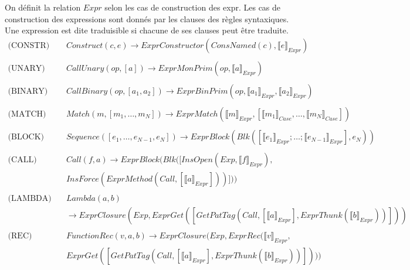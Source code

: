 \documentclass[
  12pt,
]{article}
\begin{document}
On définit la relation \({Expr}\) selon les cas de construction
des expr. Les cas de construction des expressions sont donnés par les
clauses des règles syntaxiques. Une expression est dite traduisible si
chacune de ses clauses peut être traduite. \begin{align*}
  \text{(CONSTR)} \quad & Construct(c,e) \rightarrow  ExprConstructor(ConsNamed(c), \llbracket e \rrbracket_{Expr})                                                                  \\
  \\
  \text{(UNARY)} \quad  & CallUnary(op, [a]) \rightarrow  ExprMonPrim(op, \llbracket a \rrbracket_{Expr})                                                                            \\
  \\
  \text{(BINARY)} \quad & CallBinary(op, [a_1,a_2]) \rightarrow  ExprBinPrim(op, \llbracket a_1 \rrbracket_{Expr}, \llbracket a_2 \rrbracket_{Expr})                                 \\                                    \\
  \text{(MATCH)} \quad  & Match(m,[m_1,\dots,m_N]) \rightarrow  ExprMatch(\llbracket m \rrbracket_{Expr}, [\llbracket m_1 \rrbracket_{Case},\dots,\llbracket m_N \rrbracket_{Case}]) \\
  \\
  \text{(BLOCK)} \quad  & Sequence([e_1,\dots,e_{N-1}, e_N])
  \rightarrow  ExprBlock(Blk([\llbracket e_1 \rrbracket_{Expr}; \dots ; \llbracket e_{N-1} \rrbracket_{Expr}], e_N))                                                                 \\
  \\
  \text{(CALL)} \quad   & Call(f, a)                                                 \rightarrow  ExprBlock(Blk([InsOpen(Exp, \llbracket f \rrbracket_{Expr} ),                      \\ & InsForce(ExprMethod(Call, [\llbracket a \rrbracket_{Expr}]))]))                                       \\
  \\
  \text{(LAMBDA)} \quad & Lambda(a, b)                                                                                                                                               \\
                        & \rightarrow  ExprClosure(Exp, ExprGet([GetPatTag(Call, [\llbracket a \rrbracket_{Expr}], ExprThunk(\llbracket b \rrbracket_{Expr}))]))                     \\
  \\
  \text{(REC)} \quad    & FunctionRec(v, a, b)
  \rightarrow  ExprClosure(Exp,ExprRec(\llbracket v \rrbracket_{Expr},                                                                                                               \\  & ExprGet([GetPatTag(Call, [\llbracket a \rrbracket_{Expr}], ExprThunk(\llbracket b \rrbracket_{Expr}))])))
\end{align*}
\end{document}
